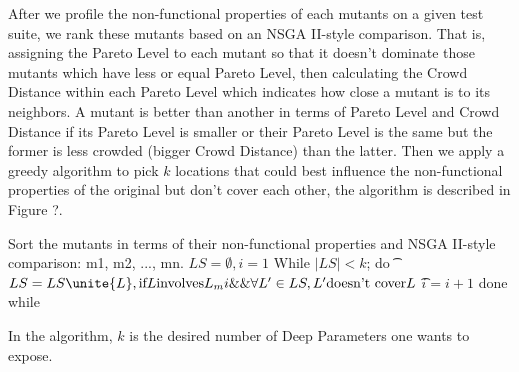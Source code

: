 After we profile the non-functional properties of each mutants on a given test suite, we rank these mutants based on an NSGA II-style comparison. That is, assigning the Pareto Level to each mutant so that it doesn't dominate those mutants which have less or equal Pareto Level, then calculating the Crowd Distance within each Pareto Level which indicates how close a mutant is to its neighbors. A mutant is better than another in terms of Pareto Level and Crowd Distance if its Pareto Level is smaller or their Pareto Level is the same but the former is less crowded (bigger Crowd Distance) than the latter. Then we apply a greedy algorithm to pick $k$ locations that could best influence the non-functional properties of the original but don't cover each other, the algorithm is described in Figure ?.

Sort the mutants in terms of their non-functional properties and NSGA II-style comparison: m1, m2, ..., mn.
$LS=\emptyset, i=1$
While $|LS|<k$; do
\t$LS=LS \unite {L}, \text{if} L \text{involves} L_mi \&\& \forall L' \in LS, L' \text{doesn't cover} L$
\t$i=i+1$
done while

In the algorithm, $k$ is the desired number of Deep Parameters one wants to expose. 
